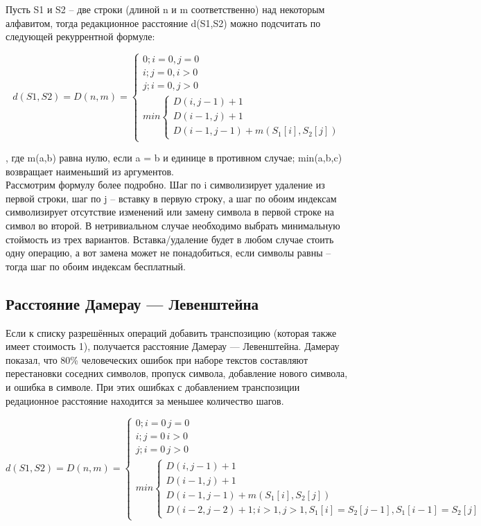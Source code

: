 \documentclass[a4paper, 14pt]{article}
\begin{document}
	Пусть S1 и S2 – две строки (длиной n и m соответственно) над некоторым алфавитом, тогда редакционное расстояние d(S1,S2) можно подсчитать по следующей рекуррентной формуле:
	
	\begin{equation*}
	d(S1,S2) = D(n, m) =
	\begin{cases}
	0; i=0, j=0\\
	i; j=0, i>0\\
	j; i=0, j>0\\
	
	min
	\begin{cases}
	D(i,j-1)+1\ \\
	D(i-1,j)+1\ \\
	D(i-1,j-1)+m(S_1 [i], S_2 [j])\
	\end{cases}
	
	\end{cases}
	\end{equation*}
	
	, где m(a,b) равна нулю, если a = b и единице в противном случае; min(a,b,c) возвращает наименьший из аргументов.\\
	
	Рассмотрим формулу более подробно. Шаг по i символизирует удаление из первой строки, шаг по j – вставку в первую строку, а шаг по обоим индексам символизирует отсутствие изменений или замену символа в первой строке на символ во второй. В нетривиальном случае необходимо выбрать минимальную стоймость из трех вариантов. Вставка/удаление будет в любом случае стоить одну операцию, а вот замена может не понадобиться, если символы равны – тогда шаг по обоим индексам бесплатный.
	
	\subsection{Расстояние Дамерау — Левенштейна}
	
	Если к списку разрешённых операций добавить транспозицию (которая также имеет стоимость 1), получается расстояние Дамерау — Левенштейна. Дамерау показал, что 80\% человеческих ошибок при наборе текстов составляют перестановки соседних символов, пропуск символа, добавление нового символа, и ошибка в символе.\cite{litlink2} При этих ошибках с добавлением транспозиции редационное расстояние находится за меньшее количество шагов.
	
	\begin{equation*}
	d(S1,S2) = D(n, m) =
	\begin{cases}
	0; i=0\, j=0\ \\
	i; j=0\, i>0\ \\
	j; i=0\, j>0\ \\
	
	min
	\begin{cases}
	D(i,j-1)+1\ \\
	D(i-1,j)+1\ \\
	D(i-1,j-1)+m(S_1 [i], S_2 [j] )\ \\
	D(i-2,j-2)+1; i>1,j>1,S_1 [i] = S_2 [j-1], S_1 [i-1]= S_2 [j]\
	\end{cases}
	
	\end{cases}
	\end{equation*}
	
\end{document}
